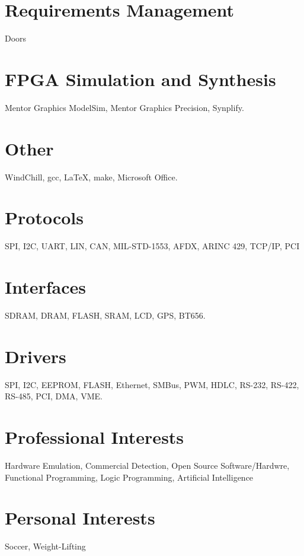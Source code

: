 \documentclass[print]{template/friggeri-cv} %
\begin{document}
\newpage

\begin{aside2} %
\section{Requirements Management}
Doors
\section{FPGA Simulation and Synthesis}
Mentor Graphics ModelSim, Mentor Graphics Precision, Synplify.
\section{Other}
WindChill, gcc, LaTeX, make, Microsoft Office.
\section{Protocols}
SPI, I2C, UART, LIN, CAN, MIL-STD-1553, AFDX, ARINC 429, TCP/IP, PCI
\section{Interfaces}
SDRAM, DRAM, FLASH, SRAM, LCD, GPS, BT656.
\section{Drivers}
SPI, I2C, EEPROM, FLASH, Ethernet, SMBus, PWM, HDLC, RS-232, RS-422, RS-485, PCI, DMA, VME.
\section{Professional Interests}
Hardware Emulation, Commercial Detection, Open Source Software/Hardwre, Functional Programming, Logic Programming, Artificial Intelligence
\section{Personal Interests}
Soccer, Weight-Lifting
\end{aside2}
\end{document}
